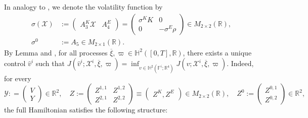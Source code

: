 \documentclass[11pt,twoside]{amsart}
\theoremstyle{definition}
\numberwithin{equation}{section}
\newcommand{\w}{\varpi}
\newcommand{\R}{\mathbb{R}}
\renewcommand{\bar}{\overline}
\begin{document}
In analogy to \cite{del2024mean}, we denote the volatility function by
\begin{align*}
    \sigma(\mathcal{X}) &:= 
    \begin{pmatrix}
        A^K_3\mathcal{X} & A^E_4  
    \end{pmatrix}
    =
    \begin{pmatrix} 
    \sigma^K K	&0	\\
    0		& -\sigma^E \rho
    \end{pmatrix}\in M_{2\times 2}(\R) ,\\  
    \sigma^0 &:= A_5 \in M_{2\times 1}(\R).
\end{align*}
By Lemma \cite[Lemma 1.56]{carmona2018probabilistic2} and \cite[equation (6.82)]{carmona2018probabilistic2}, for all processes $\bar{\xi}, \w \in \mathbb{H}^2([0,T],\R)$, there exists a unique control $\widehat{v}^i$ such that $J(\widehat{v}^i;\mathcal{X}^i,\bar{\xi},\w)= \inf_{v \in \mathbb{H}^2(\mathbb{F}^i;\mathbb{R}^4)}J(v;\mathcal{X}^i,\bar{\xi},\w)$. 
Indeed, for every
\begin{equation*}
    \mathcal{Y}: = \begin{pmatrix}V\\ Y\end{pmatrix}\in\R^2,\quad Z:= \begin{pmatrix} Z^{1,1}&Z^{1,2}\\Z^{2,1}&Z^{2,2}\end{pmatrix}\equiv \begin{pmatrix}
        Z^K, Z^E
    \end{pmatrix}\in M_{2\times2}(\R) ,\quad Z^0 := \begin{pmatrix}Z^{0,1}\\ Z^{0,2}\end{pmatrix} \in \R^2,
\end{equation*}
the full Hamiltonian satisfies the following structure: 
\end{document}
